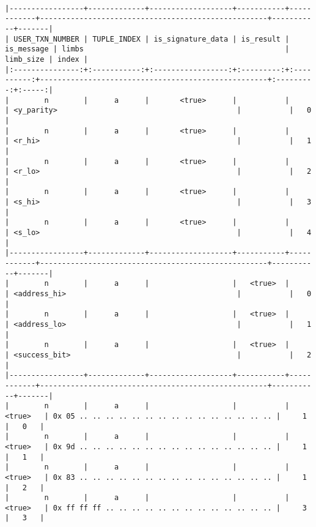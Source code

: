 \documentclass[varwidth=\maxdimen,margin=0.5cm,multi={verbatim}]{standalone}
\begin{document}
\begin{verbatim}

|-----------------+-------------+-------------------+-----------+------------+----------------------------------------------------+-----------+-------|
| USER_TXN_NUMBER | TUPLE_INDEX | is_signature_data | is_result | is_message | limbs                                              | limb_size | index |
|:---------------:+:-----------:+:-----------------:+:---------:+:----------:+----------------------------------------------------+:---------:+:-----:|
|        n        |      a      |       <true>      |           |            | <y_parity>                                         |           |   0   |
|        n        |      a      |       <true>      |           |            | <r_hi>                                             |           |   1   |
|        n        |      a      |       <true>      |           |            | <r_lo>                                             |           |   2   |
|        n        |      a      |       <true>      |           |            | <s_hi>                                             |           |   3   |
|        n        |      a      |       <true>      |           |            | <s_lo>                                             |           |   4   |
|-----------------+-------------+-------------------+-----------+------------+----------------------------------------------------+-----------+-------|
|        n        |      a      |                   |   <true>  |            | <address_hi>                                       |           |   0   |
|        n        |      a      |                   |   <true>  |            | <address_lo>                                       |           |   1   |
|        n        |      a      |                   |   <true>  |            | <success_bit>                                      |           |   2   |
|-----------------+-------------+-------------------+-----------+------------+----------------------------------------------------+-----------+-------|
|        n        |      a      |                   |           |   <true>   | 0x 05 .. .. .. .. .. .. .. .. .. .. .. .. .. .. .. |     1     |   0   |
|        n        |      a      |                   |           |   <true>   | 0x 9d .. .. .. .. .. .. .. .. .. .. .. .. .. .. .. |     1     |   1   |
|        n        |      a      |                   |           |   <true>   | 0x 83 .. .. .. .. .. .. .. .. .. .. .. .. .. .. .. |     1     |   2   |
|        n        |      a      |                   |           |   <true>   | 0x ff ff ff .. .. .. .. .. .. .. .. .. .. .. .. .. |     3     |   3   |

\end{verbatim}
\end{document}
